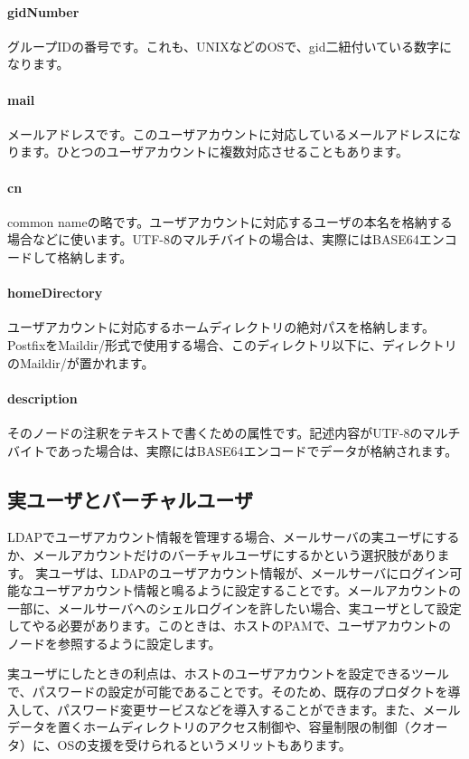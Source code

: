 \paragraph{gidNumber}
グループIDの番号です。これも、UNIXなどのOSで、gid二紐付いている数字になります。

\paragraph{mail}
メールアドレスです。このユーザアカウントに対応しているメールアドレスになります。ひとつのユーザアカウントに複数対応させることもあります。

\paragraph{cn}
common nameの略です。ユーザアカウントに対応するユーザの本名を格納する場合などに使います。UTF-8のマルチバイトの場合は、実際にはBASE64エンコードして格納します。

\paragraph{homeDirectory}
ユーザアカウントに対応するホームディレクトリの絶対パスを格納します。PostfixをMaildir/形式で使用する場合、このディレクトリ以下に、ディレクトリのMaildir/が置かれます。

\paragraph{description}
そのノードの注釈をテキストで書くための属性です。記述内容がUTF-8のマルチバイトであった場合は、実際にはBASE64エンコードでデータが格納されます。

\subsection{実ユーザとバーチャルユーザ}

LDAPでユーザアカウント情報を管理する場合、メールサーバの実ユーザにするか、メールアカウントだけのバーチャルユーザにするかという選択肢があります。
実ユーザは、LDAPのユーザアカウント情報が、メールサーバにログイン可能なユーザアカウント情報と鳴るように設定することです。メールアカウントの一部に、メールサーバへのシェルログインを許したい場合、実ユーザとして設定してやる必要があります。このときは、ホストのPAMで、ユーザアカウントのノードを参照するように設定します。

実ユーザにしたときの利点は、ホストのユーザアカウントを設定できるツールで、パスワードの設定が可能であることです。そのため、既存のプロダクトを導入して、パスワード変更サービスなどを導入することができます。また、メールデータを置くホームディレクトリのアクセス制御や、容量制限の制御（クオータ）に、OSの支援を受けられるというメリットもあります。

